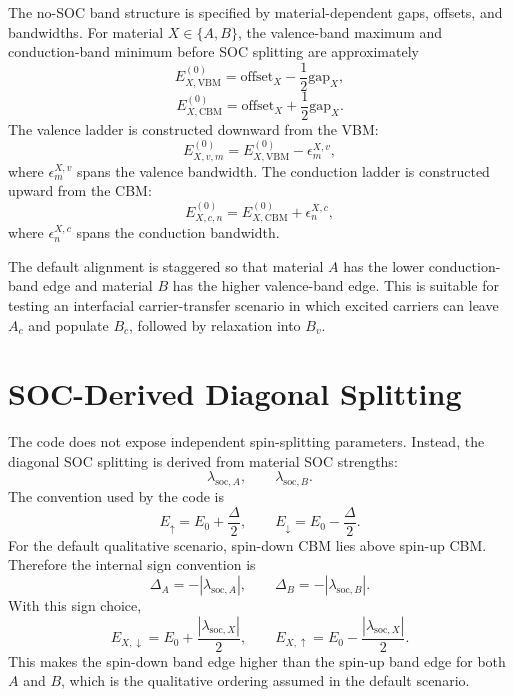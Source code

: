 \documentclass[11pt,a4paper]{article}
\begin{document}
The no-SOC band structure is specified by material-dependent gaps, offsets, and bandwidths.  For material $X\in\{A,B\}$, the valence-band maximum and conduction-band minimum before SOC splitting are approximately
\begin{equation}
E^{(0)}_{X,\mathrm{VBM}} = \mathrm{offset}_X - \frac{1}{2}\mathrm{gap}_X,
\end{equation}
\begin{equation}
E^{(0)}_{X,\mathrm{CBM}} = \mathrm{offset}_X + \frac{1}{2}\mathrm{gap}_X.
\end{equation}
The valence ladder is constructed downward from the VBM:
\begin{equation}
E^{(0)}_{X,v,m}=E^{(0)}_{X,\mathrm{VBM}}-\epsilon^{X,v}_m,
\end{equation}
where $\epsilon^{X,v}_m$ spans the valence bandwidth.  The conduction ladder is constructed upward from the CBM:
\begin{equation}
E^{(0)}_{X,c,n}=E^{(0)}_{X,\mathrm{CBM}}+\epsilon^{X,c}_n,
\end{equation}
where $\epsilon^{X,c}_n$ spans the conduction bandwidth.

The default alignment is staggered so that material $A$ has the lower conduction-band edge and material $B$ has the higher valence-band edge.  This is suitable for testing an interfacial carrier-transfer scenario in which excited carriers can leave $A_c$ and populate $B_c$, followed by relaxation into $B_v$.

\section{SOC-Derived Diagonal Splitting}

The code does not expose independent spin-splitting parameters.  Instead, the diagonal SOC splitting is derived from material SOC strengths:
\begin{equation}
\lambda_{\mathrm{soc},A},
\qquad
\lambda_{\mathrm{soc},B}.
\end{equation}
The convention used by the code is
\begin{equation}
E_{\uparrow}=E_0+\frac{\Delta}{2},
\qquad
E_{\downarrow}=E_0-\frac{\Delta}{2}.
\end{equation}
For the default qualitative scenario, spin-down CBM lies above spin-up CBM.  Therefore the internal sign convention is
\begin{equation}
\Delta_A = -|\lambda_{\mathrm{soc},A}|,
\qquad
\Delta_B = -|\lambda_{\mathrm{soc},B}|.
\end{equation}
With this sign choice,
\begin{equation}
E_{X,\downarrow}=E_0+\frac{|\lambda_{\mathrm{soc},X}|}{2},
\qquad
E_{X,\uparrow}=E_0-\frac{|\lambda_{\mathrm{soc},X}|}{2}.
\end{equation}
This makes the spin-down band edge higher than the spin-up band edge for both $A$ and $B$, which is the qualitative ordering assumed in the default scenario.
\end{document}
